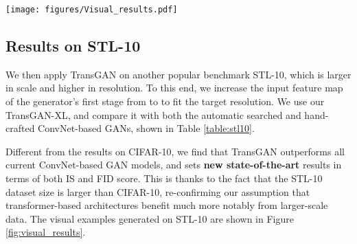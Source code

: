 \documentclass{article}
\begin{document}
\begin{figure*}[t]
\begin{center}
\texttt{[image: figures/Visual\_results.pdf]}
\end{center}
\vspace{-1em}
\caption{Visual Results of TransGAN on CIFAR-10, STL-10, and CelebA .}
\vspace{-1em}
\label{fig:visual_results}
\end{figure*}

\subsection{Results on STL-10}
We then apply TransGAN on another popular benchmark STL-10, which is larger in scale and higher in resolution. To this end, we increase the input feature map of the generator's first stage from  to  to fit the target resolution. We use our TransGAN-XL, and compare it with both the automatic searched and hand-crafted ConvNet-based GANs, shown in Table \ref{table:stl10}. 

Different from the results on CIFAR-10, we find that TransGAN outperforms all current ConvNet-based GAN models, and sets \textbf{new state-of-the-art} results in terms of both IS and FID score.
This is thanks to the fact that the STL-10 dataset size is  larger than CIFAR-10, re-confirming our assumption that transformer-based architectures benefit much more notably from larger-scale data.
The visual examples generated on STL-10 are shown in Figure \ref{fig:visual_results}.
\end{document}
